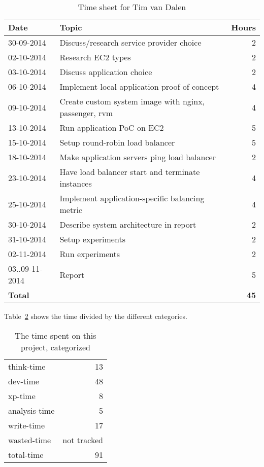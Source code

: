 \begin{table}[H]
	\begin{tabular}{l p{2.7cm} r}
		\textbf{Date}&	\textbf{Topic}&	\textbf{Hours}\\\hline
		30-09-2014 & Discuss/research service provider choice & 2 \\
		02-10-2014 & Research EC2 types & 2 \\
		03-10-2014 & Discuss application choice & 2 \\
		06-10-2014 & Implement local application proof of concept & 4 \\
		09-10-2014 & Create custom system image with nginx, passenger, rvm & 4 \\
		13-10-2014 & Run application PoC on EC2 & 5 \\
		15-10-2014 & Setup round-robin load balancer & 5 \\
		18-10-2014 & Make application servers ping load balancer & 2 \\
		23-10-2014 & Have load balancer start and terminate instances & 4 \\
		25-10-2014 & Implement application-specific balancing metric & 4 \\
		30-10-2014 & Describe system architecture in report & 2 \\
		31-10-2014 & Setup experiments & 2 \\
		02-11-2014 & Run experiments & 2 \\
		03..09-11-2014 & Report & 5 \\
		\hline
		\textbf{Total}&	&	\textbf{45}
	\end{tabular}
	\caption{Time sheet for Tim van Dalen}
	\label{tab:time:tim}
\end{table}

Table~\ref{tab:time:cat} shows the time divided by the different categories.

\begin{table}[H]
	\centering
	\begin{tabular}{l r}
		think-time& 13\\
		dev-time& 48\\
		xp-time& 8\\
		analysis-time& 5\\
		write-time& 17\\
		wasted-time& not tracked\\
		total-time& 91\\
	\end{tabular}
	\caption{The time spent on this project, categorized}
	\label{tab:time:cat}
\end{table}
